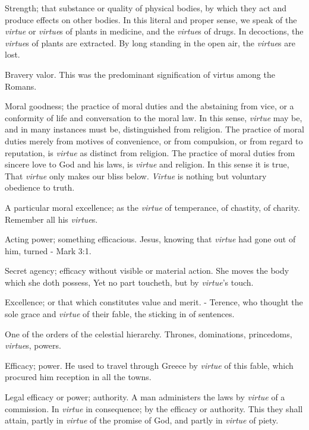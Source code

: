	\begin{compactitem}
		\item[1] Strength; that substance or quality of physical bodies, by which they act and produce effects on other bodies. In this literal and proper sense, we speak of the \textit{virtue} or \textit{virtue}s of plants in medicine, and the \textit{virtue}s of drugs. In decoctions, the \textit{virtue}s of plants are extracted. By long standing in the open air, the \textit{virtue}s are lost.
		\item[2] Bravery valor. This was the predominant signification of virtus among the Romans.
		\item[3] Moral goodness; the practice of moral duties and the abstaining from vice, or a conformity of life and conversation to the moral law. In this sense, \textit{virtue} may be, and in many instances must be, distinguished from religion. The practice of moral duties merely from motives of convenience, or from compulsion, or from regard to reputation, is \textit{virtue} as distinct from religion. The practice of moral duties from sincere love to God and his laws, is \textit{virtue} and religion. In this sense it is true, That \textit{virtue} only makes our bliss below. \textit{Virtue} is nothing but voluntary obedience to truth.
		\item[4] A particular moral excellence; as the \textit{virtue} of temperance, of chastity, of charity. Remember all his \textit{virtue}s.
		\item[5] Acting power; something efficacious. Jesus, knowing that \textit{virtue} had gone out of him, turned - Mark 3:1.
		\item[6] Secret agency; efficacy without visible or material action. She moves the body which she doth possess, Yet no part toucheth, but by \textit{virtue}'s touch.
		\item[7] Excellence; or that which constitutes value and merit. - Terence, who thought the sole grace and \textit{virtue} of their fable, the sticking in of sentences.
		\item[8] One of the orders of the celestial hierarchy. Thrones, dominations, princedoms, \textit{virtue}s, powers.
		\item[9] Efficacy; power. He used to travel through Greece by \textit{virtue} of this fable, which procured him reception in all the towns.
		\item[10] Legal efficacy or power; authority. A man administers the laws by \textit{virtue} of a commission. In \textit{virtue} in consequence; by the efficacy or authority. This they shall attain, partly in \textit{virtue} of the promise of God, and partly in \textit{virtue} of piety.
	\end{compactitem}

